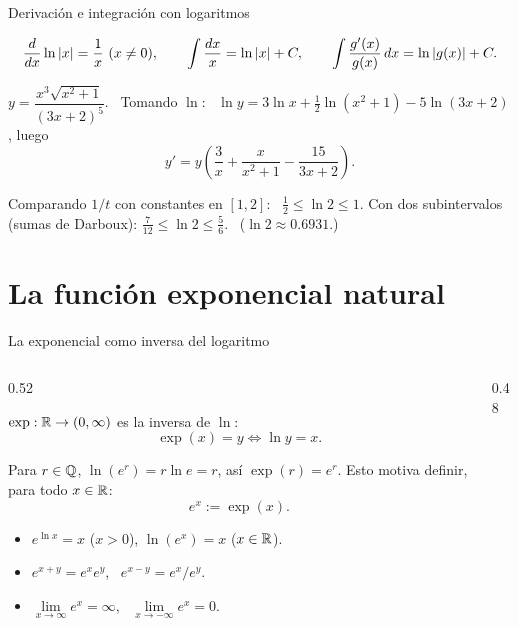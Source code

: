\documentclass[10pt,aspectratio=169]{beamer}
\begin{document}
\begin{frame}{Derivación e integración con logaritmos}
  \begin{proposicion}
    \[ \frac{d}{dx}\ln|x|=\frac1x\ (x\neq0),\qquad \int\frac{dx}{x}=\ln|x|+C,\qquad \int\frac{g'(x)}{g(x)}\dx=\ln|g(x)|+C. \]
  \end{proposicion}
  \begin{ejemplo}
    $y=\dfrac{x^3\sqrt{x^2+1}}{(3x+2)^5}$. \ Tomando $\ln$: \
    $\ln y=3\ln x+\tfrac12\ln(x^2+1)-5\ln(3x+2)$, luego
    \[ y'=y\left(\frac3x+\frac{x}{x^2+1}-\frac{15}{3x+2}\right). \]
  \end{ejemplo}
  \begin{ejemplo}[estimación de $\ln2$]
    Comparando $1/t$ con constantes en $[1,2]$: \ $\tfrac12\le\ln2\le1$.
    Con dos subintervalos (sumas de Darboux): $\tfrac{7}{12}\le\ln 2\le\tfrac{5}{6}$. \ ($\ln2\approx0.6931$.)
  \end{ejemplo}
\end{frame}

\section{La función exponencial natural}

\begin{frame}{La exponencial como inversa del logaritmo}
  \begin{columns}
    \begin{column}{0.52\textwidth}
      \begin{definicion}
        $\exp:\mathbb{R}\to(0,\infty)$ es la inversa de $\ln$:
        \[ \exp(x)=y\iff\ln y=x. \]
      \end{definicion}
      Para $r\in\mathbb{Q}$, $\ln(e^r)=r\ln e=r$, así $\exp(r)=e^r$. Esto motiva definir, para todo $x\in\mathbb{R}$:
      \[ e^x:=\exp(x). \]
      \begin{itemize}
        \item $e^{\ln x}=x$ ($x>0$), \quad $\ln(e^x)=x$ ($x\in\mathbb{R}$).
        \item $e^{x+y}=e^xe^y$, \ $e^{x-y}=e^x/e^y$.
        \item $\lim\limits_{x\to\infty}e^x=\infty$, \ $\lim\limits_{x\to-\infty}e^x=0$.
      \end{itemize}
    \end{column}
    \begin{column}{0.48\textwidth}
      \centering
    \end{column}
  \end{columns}
\end{frame}
\end{document}
